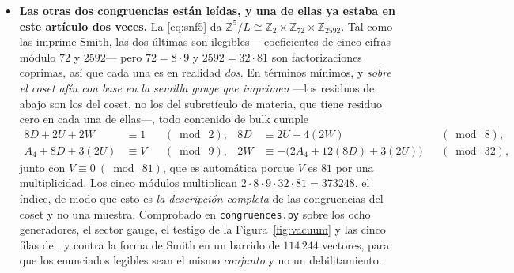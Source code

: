 \documentclass[11pt,a4paper]{article}
\newcommand{\ZZ}{\mathbb{Z}}
\begin{document}
\begin{itemize}
Dos medidas dicen cuánto de afilado, y están en \texttt{anchor\_\allowbreak delta.py}. Primera: el
residuo \emph{no} es función de los momentos ciegos a la paridad. Las filas (1) y (2) de la tabla de
\cite{KM25} tienen los mismos $S_0,S_1,S_2$ hasta el último dígito ---$87.5$, $179.5$,
$707.5$--- y sus residuos difieren en un veinticinco por ciento, algo que ningún ordenamiento
sobre cinco puntos colineales podría haber establecido. Segunda: el desdoblamiento es una
cancelación casi exacta. $D=A_2-\tfrac34B_2$ es $78.000-76.125$ en la fila (1), un residuo del
$2.4\%$, y la palanca que eso da está medida y no estimada: las filas (1) y (2) difieren un uno por
ciento en el desdoblamiento, $78.000-76.125$ frente a $79.000-75.375$, y sus $D$ difieren en un
factor $1.93$ ---de modo que $\alpha_{\min}\sim\sqrt D$ se mueve un $39\%$, el tamaño del propio
residuo. Reescalar el sector
antiperiódico por una sola $\lambda$ no repara las cinco filas, y lo que hay que juzgar es
$\lambda-1$: la perturbación exigida va del $0.2\%$ al $1.4\%$, un factor siete, de modo que
esto se suma a las reparaciones de un parámetro ya excluidas en la Parte~VI. Pero es de un solo
signo y de \emph{ese} orden en todas las filas, lo que cambia lo que el aviso afirma. No es que el
potencial esté equivocado por un factor dos; es que una traza puede estarlo en su segundo dígito,
en el único sitio donde $D$ no tiene holgura.
\item \textbf{Las otras dos congruencias están leídas, y una de ellas ya estaba en este artículo dos
veces.} La \eqref{eq:snf5} da $\ZZ^5/L\cong\ZZ_2\times\ZZ_{72}\times\ZZ_{2592}$. Tal como las
imprime Smith, las dos últimas son ilegibles ---coeficientes de cinco cifras módulo $72$ y
$2592$--- pero $72=8\cdot9$ y $2592=32\cdot81$ son factorizaciones coprimas, así que cada una es en
realidad \emph{dos}. En términos mínimos, y \emph{sobre el coset afín con base en la semilla gauge
que \cite{KM25} imprimen} ---los residuos de abajo son los del coset, no los del subretículo de
materia, que tiene residuo cero en cada una de ellas---, todo contenido de bulk cumple
\begin{equation}\label{eq:congr5}
\begin{aligned}
  8D+2U+2W&\equiv1 &&(\bmod\ 2), &  8D&\equiv 2U+4(2W) &&(\bmod\ 8),\\
  A_4+8D+3(2U)&\equiv V &&(\bmod\ 9), &
  2W&\equiv-\bigl(2A_4+12(8D)+3(2U)\bigr) &&(\bmod\ 32),
\end{aligned}
\end{equation}
junto con $V\equiv0\ (\bmod\ 81)$, que es automática porque $V$ es $81$ por una multiplicidad. Los
cinco módulos multiplican $2\cdot8\cdot9\cdot32\cdot81=373248$, el índice, de modo que esto es
\emph{la descripción completa} de las congruencias del coset y no una muestra. Comprobado en \texttt{congruences.py}
sobre los ocho generadores, el sector gauge, el testigo de la Figura~\ref{fig:vacuum} y las cinco
filas de \cite{KM25}, y contra la forma de Smith en un barrido de $114\,244$ vectores, para que los
enunciados legibles sean el mismo \emph{conjunto} y no un debilitamiento.


\end{itemize}
\end{document}

